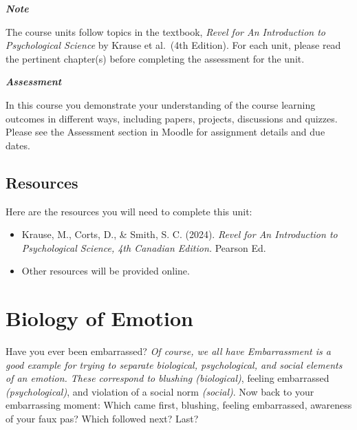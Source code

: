 \documentclass[
]{book}
\providecommand{\tightlist}{%
  \setlength{\itemsep}{0pt}\setlength{\parskip}{0pt}}
\begin{document}
\begin{caution}
\textbf{\emph{Note}}

The course units follow topics in the textbook, \emph{Revel for An Introduction to Psychological Science} by Krause et al.~(4th Edition). For each unit, please read the pertinent chapter(s) before completing the assessment for the unit.
\end{caution}

\begin{assessment}
\textbf{\emph{Assessment}}

In this course you demonstrate your understanding of the course learning outcomes in different ways, including papers, projects, discussions and quizzes. Please see the Assessment section in Moodle for assignment details and due dates.
\end{assessment}

\hypertarget{resources-7}{%
\subsection*{Resources}\label{resources-7}}

Here are the resources you will need to complete this unit:

\begin{itemize}
\tightlist
\item
  Krause, M., Corts, D., \& Smith, S. C. (2024). \emph{Revel for An Introduction to Psychological Science, 4th Canadian Edition.} Pearson Ed.\\
\item
  Other resources will be provided online.
\end{itemize}

\hypertarget{biology-of-emotion}{%
\section{Biology of Emotion}\label{biology-of-emotion}}

Have you ever been embarrassed? \emph{Of course, we all have Embarrassment is a good example for trying to sepa­rate biological, psychological, and social elements of an emotion. These correspond to blushing (biological)}, feeling embarrassed \emph{(psychological)}, and violation of a social norm \emph{(social)}. Now back to your embarrassing moment: Which came first, blushing, feeling embarrassed, awareness of your faux pas? Which followed next? Last?
\end{document}
